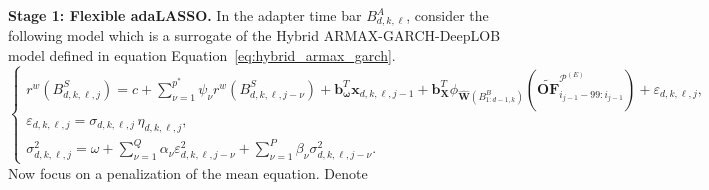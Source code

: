 \documentclass[10pt,a4paper,oneside]{article}
\providecommand{\DIFaddtex}[1]{{\protect\color{blue} \sf #1}} %
\providecommand{\DIFdeltex}[1]{{\protect\color{red} \scriptsize #1}} %
\providecommand{\DIFaddbegin}{} %
\providecommand{\DIFaddend}{} %
\providecommand{\DIFdelbegin}{} %
\providecommand{\DIFdelend}{} %
\providecommand{\DIFadd}[1]{\texorpdfstring{\DIFaddtex{#1}}{#1}} %
\providecommand{\DIFdel}[1]{\texorpdfstring{\DIFdeltex{#1}}{}} %
\newcommand{\DIFscaledelfig}{0.5}
\newlength{\DIFdelgraphicswidth} %
\newlength{\DIFdelgraphicsheight} %
\newcommand{\DIFaddincludegraphics}[2][]{{\color{blue}\fbox{\DIFOincludegraphics[#1]{#2}}}} %
\newcommand{\DIFdelincludegraphics}[2][]{%
\sbox{\DIFdelgraphicsbox}{\DIFOincludegraphics[#1]{#2}}%
\settoboxwidth{\DIFdelgraphicswidth}{\DIFdelgraphicsbox} %
\settoboxtotalheight{\DIFdelgraphicsheight}{\DIFdelgraphicsbox} %
\scalebox{\DIFscaledelfig}{%
\parbox[b]{\DIFdelgraphicswidth}{\usebox{\DIFdelgraphicsbox}\\[-\baselineskip] \rule{\DIFdelgraphicswidth}{0em}}\llap{\resizebox{\DIFdelgraphicswidth}{\DIFdelgraphicsheight}{%
\setlength{\unitlength}{\DIFdelgraphicswidth}%
\begin{picture}(1,1)%
\thicklines\linethickness{2pt} %
{\color[rgb]{1,0,0}\put(0,0){\framebox(1,1){}}}%
{\color[rgb]{1,0,0}\put(0,0){\line( 1,1){1}}}%
{\color[rgb]{1,0,0}\put(0,1){\line(1,-1){1}}}%
\end{picture}%
}\hspace*{3pt}}} %
} %
\DeclareRobustCommand{\DIFaddbegin}{\DIFOaddbegin \let\includegraphics\DIFaddincludegraphics} %
\DeclareRobustCommand{\DIFaddend}{\DIFOaddend \let\includegraphics\DIFOincludegraphics} %
\DeclareRobustCommand{\DIFdelbegin}{\DIFOdelbegin \let\includegraphics\DIFdelincludegraphics} %
\DeclareRobustCommand{\DIFdelend}{\DIFOaddend \let\includegraphics\DIFOincludegraphics} %
\begin{document}
\noindent\textbf{Stage 1: Flexible adaLASSO.}  In the adapter time bar $B^A_{d, k, \ell}$, consider the following model which is a surrogate of the Hybrid ARMAX-GARCH-DeepLOB model defined in \DIFdelbegin \DIFdel{equation}\DIFdelend \DIFaddbegin \DIFadd{Equation}\DIFaddend ~\eqref{eq:hybrid_armax_garch}.
\begin{equation}
    \DIFdelbegin %
\DIFdelend \DIFaddbegin \begin{cases}
        r^w\left( B^S_{d, k, \ell, j} \right) = c + \sum^{p^*}_{\nu = 1} \psi_{\nu} r^w \left( B^S_{d, k, \ell, j - \nu} \right) + \mathbf{b}_{\boldsymbol{\omega}}^T \mathbf{x}_{d, k, \ell, j - 1} + \mathbf{b}^T_{\mathbf{X}}\phi_{\hat{\mathbf{W}}\left( B^B_{1:d - 1, k} \right)} \left( \widetilde{\mathbf{OF}}^{\mathcal{P}^{(E)}}_{i_{j - 1} - 99:i_{j - 1}} \right) + \varepsilon_{d, k, \ell, j}, \\[6pt]
        \varepsilon_{d, k, \ell, j} = \sigma_{d, k, \ell, j} \,\eta_{d, k, \ell, j},\\[6pt]
        \sigma_{d, k, \ell, j}^2 = \omega + \sum^{Q}_{\nu = 1} \alpha_{\nu} \varepsilon^2_{d, k, \ell, j - \nu} + \sum^P_{\nu = 1} \beta_{\nu} \sigma_{d, k, \ell, j - \nu}^2.
    \end{cases}\DIFaddend 
    \label{eq:surrogate}
\end{equation}
Now focus on a penalization of the mean equation.  Denote
\end{document}
